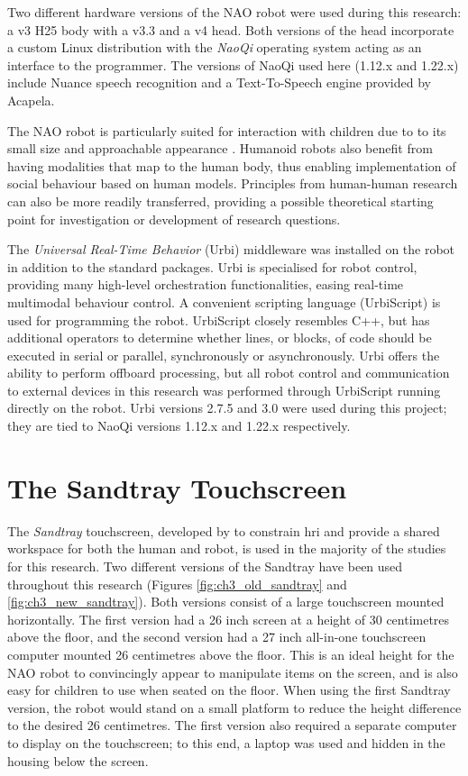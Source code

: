 Two different hardware versions of the NAO robot were used during this research: a v3 H25 body with a v3.3 and a v4 head. Both versions of the head incorporate a custom Linux distribution with the \textit{NaoQi} operating system acting as an interface to the programmer. The versions of NaoQi used here (1.12.x and 1.22.x) include Nuance speech recognition and a Text-To-Speech engine provided by Acapela.

The NAO robot is particularly suited for interaction with children due to to its small size and approachable appearance \citep{shamsuddin2012initial}. Humanoid robots also benefit from having modalities that map to the human body, thus enabling implementation of social behaviour based on human models. Principles from human-human research can also be more readily transferred, providing a possible theoretical starting point for investigation or development of research questions.

The \textit{Universal Real-Time Behavior} (Urbi) middleware \citep{baillie2008urbi} was installed on the robot in addition to the standard packages. Urbi is specialised for robot control, providing many high-level orchestration functionalities, easing real-time multimodal behaviour control. A convenient scripting language (UrbiScript) is used for programming the robot. UrbiScript closely resembles C++, but has additional operators to determine whether lines, or blocks, of code should be executed in serial or parallel, synchronously or asynchronously. Urbi offers the ability to perform offboard processing, but all robot control and communication to external devices in this research was performed through UrbiScript running directly on the robot. Urbi versions 2.7.5 and 3.0 were used during this project; they are tied to NaoQi versions 1.12.x and 1.22.x respectively.

\section{The Sandtray Touchscreen}\label{sec:method-sandtray}
The \textit{Sandtray} touchscreen, developed by \cite{baxter2012touchscreen} to constrain \acrshort{hri} and provide a shared workspace for both the human and robot, is used in the majority of the studies for this research. Two different versions of the Sandtray have been used throughout this research (Figures \ref{fig:ch3_old_sandtray} and \ref{fig:ch3_new_sandtray}). Both versions consist of a large touchscreen mounted horizontally. The first version had a 26 inch screen at a height of 30 centimetres above the floor, and the second version had a 27 inch all-in-one touchscreen computer mounted 26 centimetres above the floor. This is an ideal height for the NAO robot to convincingly appear to manipulate items on the screen, and is also easy for children to use when seated on the floor. When using the first Sandtray version, the robot would stand on a small platform to reduce the height difference to the desired 26 centimetres. The first version also required a separate computer to display on the touchscreen; to this end, a laptop was used and hidden in the housing below the screen.

